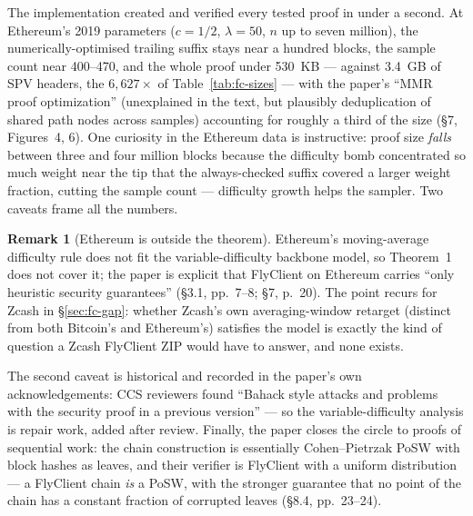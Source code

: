 \documentclass[11pt,a4paper]{article}
\theoremstyle{definition}
\newtheorem{remark}[theorem]{Remark}
\begin{document}
The implementation created and verified every tested proof in under a
second. At Ethereum's 2019 parameters ($c = 1/2$, $\lambda = 50$, $n$ up
to seven million), the numerically-optimised trailing suffix stays near a
hundred blocks, the sample count near 400--470, and the whole proof under
530~KB --- against 3.4~GB of SPV headers, the $6{,}627\times$ of
Table~\ref{tab:fc-sizes} --- with the paper's ``MMR proof optimization''
(unexplained in the text, but plausibly deduplication of shared path nodes
across samples) accounting for roughly a third of the size (\S7,
Figures~4, 6).
One curiosity in the Ethereum data is instructive: proof size
\emph{falls} between three and four million blocks because the difficulty
bomb concentrated so much weight near the tip that the always-checked
suffix covered a larger weight fraction, cutting the sample count ---
difficulty growth helps the sampler. Two caveats frame all the numbers.

\begin{remark}[Ethereum is outside the theorem]\label{rem:fc-ethereum}
Ethereum's moving-average difficulty rule does not fit the
variable-difficulty backbone model, so Theorem~1 does not cover it; the
paper is explicit that FlyClient on Ethereum carries ``only heuristic
security guarantees'' (\S3.1, pp.~7--8; \S7, p.~20). The point recurs for
Zcash in \S\ref{sec:fc-gap}: whether Zcash's own averaging-window
retarget (distinct from both Bitcoin's and Ethereum's) satisfies the
model is exactly the kind of question a Zcash FlyClient ZIP would have to
answer, and none exists.
\end{remark}

The second caveat is historical and recorded in the paper's own
acknowledgements: CCS reviewers found ``Bahack style attacks and problems
with the security proof in a previous version'' --- so the
variable-difficulty analysis is repair work, added after review. Finally,
the paper closes the circle to proofs
of sequential work: the chain construction is essentially Cohen--Pietrzak
PoSW with block hashes as leaves, and their verifier is FlyClient with a
uniform distribution --- a FlyClient chain \emph{is} a PoSW, with the
stronger guarantee that no point of the chain has a constant fraction of
corrupted leaves (\S8.4, pp.~23--24).


\end{document}
